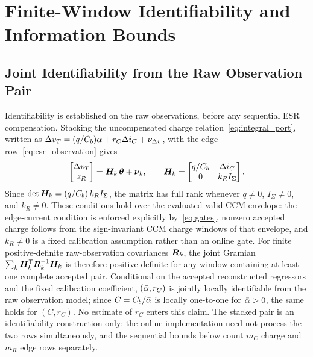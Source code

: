 ﻿\section{Finite-Window Identifiability and Information Bounds}
\label{sec:identifiability}

\subsection{Joint Identifiability from the Raw Observation Pair}

Identifiability is established on the raw observations, before any sequential ESR compensation. Stacking the uncompensated charge relation~\eqref{eq:integral_port}, written as $\Delta v_T=(q/C_b)\bar{\alpha}+r_C\Delta i_C+\nu_{\Delta v}$, with the edge row~\eqref{eq:esr_observation} gives
\begin{equation}
\begin{bmatrix}\Delta v_T\\z_R\end{bmatrix}
=\bm{H}_k\,\bm{\theta}+\bm{\nu}_k,
\qquad
\bm{H}_k=
\begin{bmatrix}q/C_b&\Delta i_C\\0&k_RI_\Sigma\end{bmatrix}.
\label{eq:joint_obs}
\end{equation}
Since $\det\bm{H}_k=(q/C_b)\,k_RI_\Sigma$, the matrix has full rank whenever $q\neq0$, $I_\Sigma\neq0$, and $k_R\neq0$. These conditions hold over the evaluated valid-CCM envelope: the edge-current condition is enforced explicitly by~\eqref{eq:gates}, nonzero accepted charge follows from the sign-invariant CCM charge windows of that envelope, and $k_R\neq0$ is a fixed calibration assumption rather than an online gate. For finite positive-definite raw-observation covariances $\bm{R}_k$, the joint Gramian $\sum_k\bm{H}_k^{\mathsf T}\bm{R}_k^{-1}\bm{H}_k$ is therefore positive definite for any window containing at least one complete accepted pair. Conditional on the accepted reconstructed regressors and the fixed calibration coefficient, $(\bar{\alpha},r_C)$ is jointly locally identifiable from the raw observation model; since $C=C_b/\bar{\alpha}$ is locally one-to-one for $\bar{\alpha}>0$, the same holds for $(C,r_C)$. No estimate of $r_C$ enters this claim. The stacked pair is an identifiability construction only: the online implementation need not process the two rows simultaneously, and the sequential bounds below count $m_C$ charge and $m_R$ edge rows separately.

